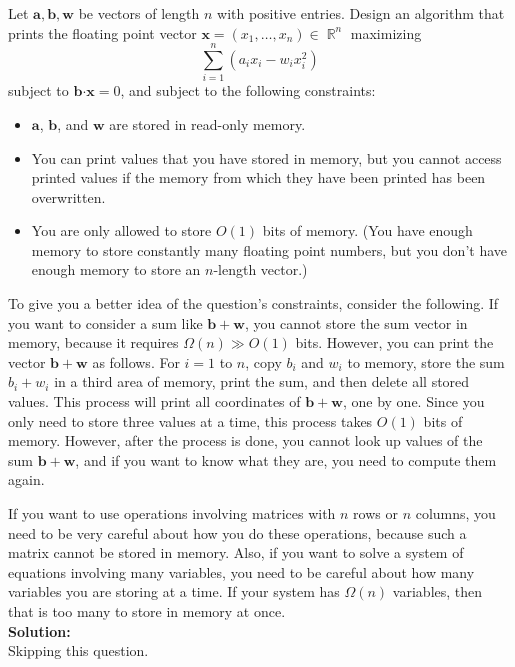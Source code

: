 \documentclass{article}
\DeclareMathOperator{\R}{\mathbb R}
\newcommand{\mb}{\mathbf}
\newcommand{\dotp}{\boldsymbol{\cdot}}
\begin{document}
Let $\mb a, \mb b, \mb w$ be vectors of length $n$ with positive entries. Design an algorithm that prints the floating point vector $\mb x = (x_1, \dots, x_n) \in \R^n$ maximizing
\[\sum_{i=1}^n ( a_i x_i - w_i x_i^2 )\]
subject to $\mb b \dotp \mb x = 0$, and subject to the following constraints:
\begin{itemize}
\item $\mb a$, $\mb b$, and $\mb w$ are stored in read-only memory.
\item You can print values that you have stored in memory, but you cannot access printed values if the memory from which they have been printed has been overwritten.
\item You are only allowed to store $O(1)$ bits of memory. (You have enough memory to store constantly many floating point numbers, but you don't have enough memory to store an $n$-length vector.)
\end{itemize}
To give you a better idea of the question's constraints, consider the following. If you want to consider a sum like $\mb b + \mb w$, you cannot store the sum vector in memory, because it requires $\Omega(n)  \gg O(1)$ bits. However, you can print the vector $\mb b + \mb w$ as follows. For $i=1$ to $n$, copy $b_i$ and $w_i$ to memory, store the sum $b_i + w_i$ in a third area of memory, print the sum, and then delete all stored values. This process will print all coordinates of $\mb b + \mb w$, one by one. Since you only need to store three values at a time, this process takes $O(1)$ bits of memory. However, after the process is done, you cannot look up values of the sum $\mb b + \mb w$, and if you want to know what they are, you need to compute them again.

If you want to use operations involving matrices with $n$ rows or $n$ columns, you need to be very careful about how you do these operations, because such a matrix cannot be stored in memory. Also, if you want to solve a system of equations involving many variables, you need to be careful about how many variables you are storing at a time. If your system has $\Omega(n)$ variables, then that is too many to store in memory at once. \\

\textbf{Solution:} \\

Skipping this question.
\end{document}
